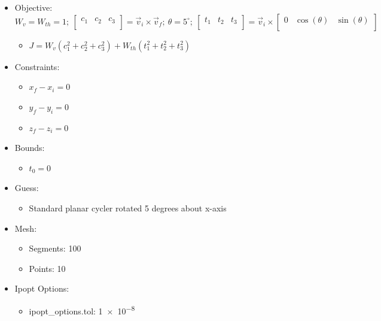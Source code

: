 \documentclass{article}
\begin{document}
\begin{itemize}
    \item Objective: $W_v = W_{th} = 1;\ \left[\begin{matrix}c_1&c_2&c_3\\\end{matrix}\right] = \vec{v}_i\times\vec{v}_f;\ \theta=5^\circ;\ \left[\begin{matrix}t_1&t_2&t_3\\\end{matrix}\right] = \vec{v}_i\times\left[\begin{matrix}0&\cos\left(\theta\right)&\sin\left(\theta\right)\\\end{matrix}\right]$
    \begin{itemize}
        \item $J = W_v\left(c_1^2 + c_2^2 + c_3^2\right) + W_{th}\left(t_1^2 + t_2^2 + t_3^2\right)$
    \end{itemize}
    \item Constraints:
    \begin{itemize}
        \item $x_f - x_i = 0$
        \item $y_f - y_i = 0$
        \item $z_f - z_i = 0$
    \end{itemize}
    \item Bounds:
    \begin{itemize}
        \item $t_0 = 0$
    \end{itemize}
    \item Guess:
    \begin{itemize}
        \item Standard planar cycler rotated 5 degrees about x-axis
    \end{itemize}
    \item Mesh:
    \begin{itemize}
        \item Segments: 100
        \item Points: 10
    \end{itemize}
    \item Ipopt Options:
    \begin{itemize}
        \item ipopt\_options.tol: \num{1e-8}
    \end{itemize}
\end{itemize}
\end{document}
